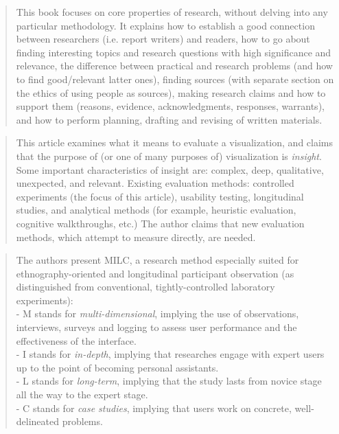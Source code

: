 		\begin{quote}
		\small
		This book focuses on core properties of research, without delving into any particular methodology.
		It explains how to establish a good connection between researchers (i.e. report writers) and readers,
		how to go about finding interesting topics and research questions with high significance and relevance,
		the difference between practical and research problems (and how to find good/relevant latter ones),
		finding sources (with separate section on the ethics of using people as sources),
		making research claims and how to support them (reasons, evidence, acknowledgments, responses, warrants),
		and how to perform planning, drafting and revising of written materials.
		\end{quote}



		
		\begin{quote}
		\small
		This article examines what it means to evaluate a visualization, and claims
		that the purpose of (or one of many purposes of) visualization is {\em insight}.
		Some important characteristics of insight are:
		complex, deep, qualitative, unexpected, and relevant.
		Existing evaluation methods:
		controlled experiments (the focus of this article),
		usability testing,
		longitudinal studies,
		and analytical methods (for example, heuristic evaluation, cognitive walkthroughs, etc.)
		The author claims that new evaluation methods, which attempt to measure directly,
		are needed.
		\end{quote}

		\begin{quote}
		\small
		The authors present MILC, a research method especially suited for 
		ethnography-oriented and longitudinal participant observation (as distinguished
		from conventional, tightly-controlled laboratory experiments):\\
		- M stands for {\em multi-dimensional}, implying the use of observations, interviews, surveys
		and logging to assess user performance and the effectiveness of the interface.\\
		- I stands for {\em in-depth}, implying that researches engage with expert users
		up to the point of becoming personal assistants.\\
		- L stands for {\em long-term}, implying that the study lasts from novice stage all the
		way to the expert stage.\\
		- C stands for {\em case studies}, implying that users work on concrete, well-delineated 
		problems.
		\end{quote}


